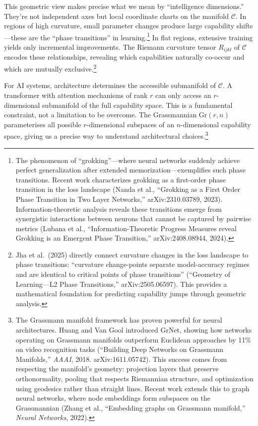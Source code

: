 \documentclass[acmsmall,screen]{acmart}
\begin{document}
This geometric view makes precise what we mean by ``intelligence dimensions.'' They're not independent axes but local coordinate charts on the manifold $\mathcal{C}$. In regions of high curvature, small parameter changes produce large capability shifts---these are the ``phase transitions'' in learning.\footnote{The phenomenon of ``grokking''---where neural networks suddenly achieve perfect generalization after extended memorization---exemplifies such phase transitions. Recent work characterizes grokking as a first-order phase transition in the loss landscape (Nanda et al., ``Grokking as a First Order Phase Transition in Two Layer Networks,'' arXiv:2310.03789, 2023). Information-theoretic analysis reveals these transitions emerge from synergistic interactions between neurons that cannot be captured by pairwise metrics (Lubana et al., ``Information-Theoretic Progress Measures reveal Grokking is an Emergent Phase Transition,'' arXiv:2408.08944, 2024).} In flat regions, extensive training yields only incremental improvements. The Riemann curvature tensor $R_{ijkl}$ of $\mathcal{C}$ encodes these relationships, revealing which capabilities naturally co-occur and which are mutually exclusive.\footnote{Jha et al.\ (2025) directly connect curvature changes in the loss landscape to phase transitions: ``curvature change-points separate model-accuracy regimes and are identical to critical points of phase transitions'' (``Geometry of Learning---L2 Phase Transitions,'' arXiv:2505.06597). This provides a mathematical foundation for predicting capability jumps through geometric analysis.}

For AI systems, architecture determines the accessible submanifold of $\mathcal{C}$. A transformer with attention mechanisms of rank $r$ can only access an $r$-dimensional submanifold of the full capability space. This is a fundamental constraint, not a limitation to be overcome. The Grassmannian $\text{Gr}(r,n)$ parameterises all possible $r$-dimensional subspaces of an $n$-dimensional capability space, giving us a precise way to understand architectural choices.\footnote{The Grassmann manifold framework has proven powerful for neural architectures. Huang and Van Gool introduced GrNet, showing how networks operating on Grassmann manifolds outperform Euclidean approaches by 11\% on video recognition tasks (``Building Deep Networks on Grassmann Manifolds,'' \textit{AAAI}, 2018. arXiv:1611.05742). This success comes from respecting the manifold's geometry: projection layers that preserve orthonormality, pooling that respects Riemannian structure, and optimization using geodesics rather than straight lines. Recent work extends this to graph neural networks, where node embeddings form subspaces on the Grassmannian (Zhang et al., ``Embedding graphs on Grassmann manifold,'' \textit{Neural Networks}, 2022).}
\end{document}
